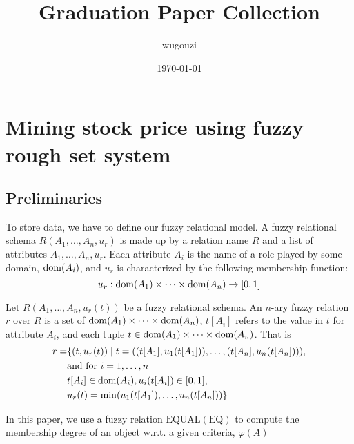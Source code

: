 \documentclass[11pt]{article}
\author{wugouzi}
\date{\today}
\title{Graduation Paper Collection}
\def \EQ {\text{EQ}}
\def \EQUAL {\text{EQUAL}}
\begin{document}
\maketitle
\tableofcontents


\section{Mining stock price using fuzzy rough set system}
\label{sec:org522293b}
\subsection{Preliminaries}
\label{sec:orgca4a0f3}
To store data, we have to define our fuzzy relational model. A fuzzy
relational schema \(R(A_1,\dots,A_n,u_r)\) is made up by a relation name
\(R\) and a list of attributes \(A_1,\dots,A_n,u_r\). Each attribute \(A_i\)
is the name of a role played by some domain, \(\operatorname{dom}(A_i)\), and \(u_r\) is
characterized by the following membership function:
\begin{equation*}
u_r:\operatorname{dom}(A_1)\times\dots\times\operatorname{dom}(A_n)\to[0,1]
\end{equation*}

\begin{definition}[]
Let \(R(A_1,\dots,A_n,u_r(t))\) be a fuzzy relational schema. An \(n\)-ary
fuzzy relation \(r\) over \(R\) is a set of
\(\operatorname{dom}(A_1)\times\dots\times\operatorname{dom}(A_n)\), \(t[A_i]\) refers to the value in
\(t\) for attribute \(A_i\), and each tuple
\(t\in\operatorname{dom}(A_1)\times\dots\times\operatorname{dom}(A_n)\). That is
\begin{align*}
r=&\{(t,u_r(t))\mid
t=((t[A_1],u_1(t[A_1])),\dots,(t[A_n],u_n(t[A_n]))),\\
&\text{and for }i=1,\dots,n\\
&t[A_i]\in\operatorname{dom}(A_i),u_i(t[A_i])\in[0,1],\\
&u_r(t)=\min(u_1(t[A_1]),\dots,u_n(t[A_n]))
\}
\end{align*}
\end{definition}

In this paper, we use a fuzzy relation \(\EQUAL(\EQ)\) to compute the
membership degree of an object w.r.t. a given criteria, \(\varphi(A)\)
\end{document}
